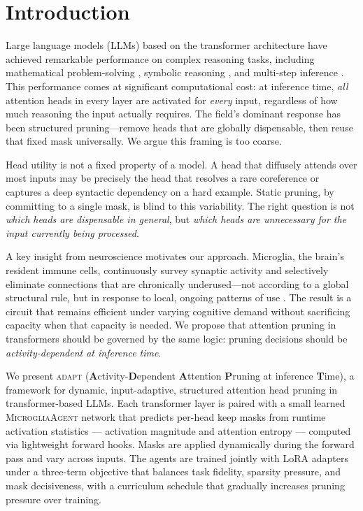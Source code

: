 \documentclass{article}
\newcommand{\agent}{\textsc{MicrogliaAgent}}
\newcommand{\system}{\textsc{adapt}}
\begin{document}
\section{Introduction}
\label{sec:intro}

Large language models (LLMs) based on the transformer architecture \citep{vaswani2017attention}
have achieved remarkable performance on complex reasoning tasks, including mathematical
problem-solving \citep{wei2022chain}, symbolic reasoning \citep{suzgun2022challenging}, and
multi-step inference \citep{lightman2023lets}. This performance comes at significant
computational cost: at inference time, \emph{all} attention heads in every layer are activated
for \emph{every} input, regardless of how much reasoning the input actually requires. The
field's dominant response has been structured pruning---remove heads that are globally
dispensable, then reuse that fixed mask universally. We argue this framing is too coarse.

Head utility is not a fixed property of a model. A head that diffusely attends over most
inputs may be precisely the head that resolves a rare coreference or captures a deep
syntactic dependency on a hard example. Static pruning, by committing to a single mask, is
blind to this variability. The right question is not \emph{which heads are dispensable in
general}, but \emph{which heads are unnecessary for the input currently being processed}.

A key insight from neuroscience motivates our approach. Microglia, the brain's resident
immune cells, continuously survey synaptic activity and selectively eliminate connections that
are chronically underused---not according to a global structural rule, but in response to
local, ongoing patterns of use \citep{stevens2007complement,paolicelli2011synaptic}. The
result is a circuit that remains efficient under varying cognitive demand without sacrificing
capacity when that capacity is needed. We propose that attention pruning in transformers
should be governed by the same logic: pruning decisions should be \emph{activity-dependent at
inference time}.

We present \system{} (\textbf{A}ctivity-\textbf{D}ependent \textbf{A}ttention \textbf{P}runing
at inference \textbf{T}ime), a framework for dynamic, input-adaptive, structured attention
head pruning in transformer-based LLMs. Each transformer layer is paired with a small learned
\agent{} network that predicts per-head keep masks from runtime activation statistics ---
activation magnitude and attention entropy --- computed via lightweight forward hooks. Masks
are applied dynamically during the forward pass and vary across inputs. The agents are trained
jointly with LoRA adapters under a three-term objective that balances task fidelity, sparsity
pressure, and mask decisiveness, with a curriculum schedule that gradually increases pruning
pressure over training.
\end{document}
